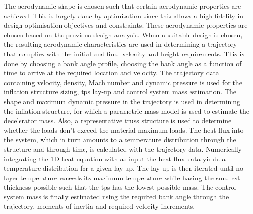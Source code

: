 The aerodynamic shape is chosen such that certain aerodynamic properties are achieved. This is largely done by optimisation since this allows a high fidelity in design optimisation objectives and constraints. These aerodynamic properties are chosen based on the previous design analysis. 
When a suitable design is chosen, the resulting aerodynamic characteristics are used in determining a trajectory that complies with the initial and final velocity and height requirements. This is done by choosing a bank angle profile, choosing the bank angle as a function of time to arrive at the required location and velocity. 
The trajectory data containing velocity, density, Mach number and dynamic pressure is used for the inflation structure sizing, \gls{tps} lay-up and control system mass estimation. The shape and maximum dynamic pressure in the trajectory is used in determining the inflation structure, for which a parametric mass model is used to estimate the decelerator mass. 
Also, a representative truss structure is used to determine whether the loads don't exceed the material maximum loads. The heat flux into the system, which in turn amounts to a temperature distribution through the structure and through time, is calculated with the trajectory data. Numerically integrating the 1D heat equation with as input the heat flux data yields a temperature distribution for a given lay-up. The lay-up is then iterated until no layer temperature exceeds its maximum temperature while having the smallest thickness possible such that the \gls{tps} has the lowest possible mass. 
The control system mass is finally estimated using the required bank angle through the trajectory, moments of inertia and required velocity increments.

